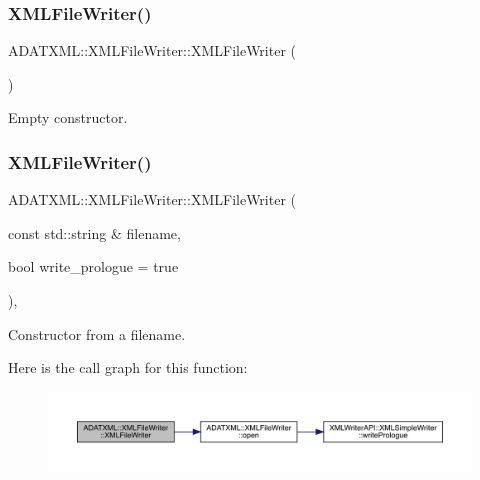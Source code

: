 \subsubsection{\texorpdfstring{XMLFileWriter()}{XMLFileWriter()}\hspace{0.1cm}{\footnotesize\ttfamily [3/4]}}
{\footnotesize\ttfamily A\+D\+A\+T\+X\+M\+L\+::\+X\+M\+L\+File\+Writer\+::\+X\+M\+L\+File\+Writer (\begin{DoxyParamCaption}{ }\end{DoxyParamCaption})}



Empty constructor. 

\mbox{\label{classADATXML_1_1XMLFileWriter_a83cf749ff969a30d3de1895f271b238a}} 
\subsubsection{\texorpdfstring{XMLFileWriter()}{XMLFileWriter()}\hspace{0.1cm}{\footnotesize\ttfamily [4/4]}}
{\footnotesize\ttfamily A\+D\+A\+T\+X\+M\+L\+::\+X\+M\+L\+File\+Writer\+::\+X\+M\+L\+File\+Writer (\begin{DoxyParamCaption}\item[{const std\+::string \&}]{filename,  }\item[{bool}]{write\+\_\+prologue = {\ttfamily true} }\end{DoxyParamCaption})\hspace{0.3cm}{\ttfamily [inline]}, {\ttfamily [explicit]}}



Constructor from a filename. 

Here is the call graph for this function\+:
\nopagebreak
\begin{figure}[H]
\begin{center}
\leavevmode
\includegraphics[width=350pt]{d6/ddb/classADATXML_1_1XMLFileWriter_a83cf749ff969a30d3de1895f271b238a_cgraph}
\end{center}
\end{figure}
\mbox{\label{classADATXML_1_1XMLFileWriter_af3d1109d92631884682eac46624ca7fd}} 
